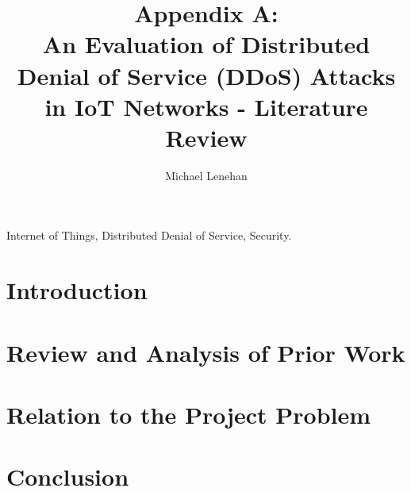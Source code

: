 \documentclass[a4paper, journal]{IEEEtran}
\begin{document}
\setcounter{page}{1}
\renewcommand{\thepage}{A-\arabic{page}}
\title{Appendix A: \\
	\large An Evaluation of Distributed Denial of Service (DDoS) Attacks in IoT
Networks - Literature Review}
\author{Michael Lenehan}

%
{}

\maketitle

\begin{abstract}
	
\end{abstract}

\begin{IEEEkeywords}
	Internet of Things, Distributed Denial of Service, Security.
\end{IEEEkeywords}

\section{Introduction}


\section{Review and Analysis of Prior Work}


\section{Relation to the Project Problem}


\section{Conclusion}



\printbibliography
\end{document}
